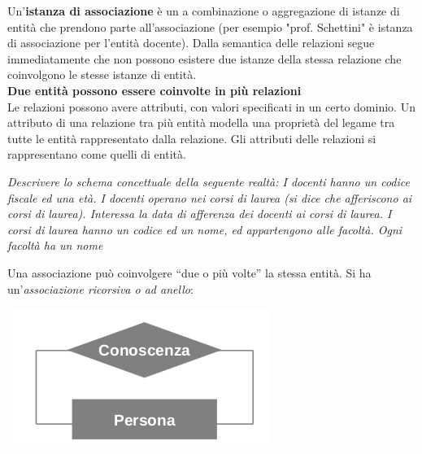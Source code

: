 \documentclass[a4paper,12pt, oneside]{book}
\begin{document}
Un'\textbf{istanza di associazione} è un a combinazione o aggregazione di istanze di entità che prendono parte all'associazione (per esempio "prof. Schettini" è istanza di associazione per l'entità docente). Dalla semantica delle relazioni segue immediatamente che non possono esistere due istanze della stessa relazione che coinvolgono le stesse istanze di entità.\\
\textbf{Due entità possono essere coinvolte in più relazioni}
\\
Le relazioni possono avere attributi, con valori specificati in un certo dominio. Un attributo di una relazione tra più entità modella una proprietà del legame tra tutte le entità rappresentato dalla relazione. Gli attributi delle relazioni si rappresentano come quelli di entità.

\newpage
\textit{Descrivere lo schema concettuale della seguente
realtà:
I docenti hanno un codice fiscale ed una età. I
docenti operano nei corsi di laurea (si dice che
afferiscono ai corsi di laurea). Interessa la data di
afferenza dei docenti ai corsi di laurea. I corsi di
laurea hanno un codice ed un nome, ed
appartengono alle facoltà. Ogni facoltà ha un nome}
\begin{center}
\end{center}
\newpage
Una associazione può coinvolgere “due o più volte”
la stessa entità. Si ha un'\textit{associazione ricorsiva o ad anello}:
\begin{center}
\includegraphics[scale=2.5]{img/bas7.png}
\end{center}
\end{document}
